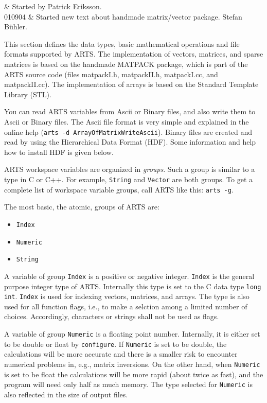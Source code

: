 
 \label{sec:formats}
 
 & Started by Patrick Eriksson. \\
  010904 & Started new text about handmade matrix/vector package. Stefan B\"uhler.\\
\stophistory

This section defines the data types, basic mathematical operations
and file formats supported by ARTS. The implementation of vectors,
matrices, and sparse matrices is based on the handmade MATPACK
package, which is part of the ARTS source code (files matpackI.h,
matpackII.h, matpackI.cc, and matpackII.cc). The implementation of
arrays is based on the Standard Template Library (STL).

You can read ARTS variables from Ascii or Binary files, and also
write them to Ascii or Binary files. The Ascii file format is very
simple and explained in the online help %
(\verb|arts -d ArrayOfMatrixWriteAscii|).  Binary files are created
and read by using the Hierarchical Data Format (HDF). Some
information and help how to install HDF is given below.

ARTS workspace variables are organized in \emph{groups}. Such a group
is similar to a type in C or C++. For example, \verb|String| and
\verb|Vector| are both groups. To get a complete list of workspace
variable groups, call ARTS like this: \verb|arts -g|.

 \label{sec:formats:datatypes}

\label{sec:formats:atomic}
 
The most basic, the atomic, groups of ARTS are:

\begin{itemize}
\item \verb|Index|
\item \verb|Numeric|
\item \verb|String|
\end{itemize}
A variable of group \verb|Index| is a positive or negative integer.
\verb|Index| is the general purpose integer type of ARTS.  Internally
this type is set to the C data type \verb|long int|. \verb|Index| is
used for indexing vectors, matrices, and arrays. The type is also used
for all function flags, i.e., to make a selction among a limited number
of choices. Accordingly, characters or strings shall not be used as
flags.

A variable of group \verb|Numeric| is a floating point number.
Internally, it is either set to be double or float by
\verb|configure|. If \verb|Numeric| is set to be double, the
calculations will be more accurate and there is a smaller risk to
encounter numerical problems in, e.g., matrix inversions.  On the
other hand, when \verb|Numeric| is set to be float the calculations
will be more rapid (about twice as fast), and the program will need
only half as much memory. The type selected for \verb|Numeric| is also
reflected in the size of output files.

